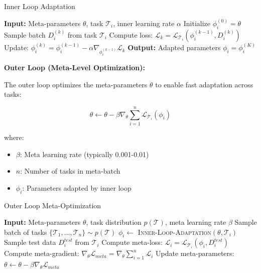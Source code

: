 \documentclass[12pt]{article}
\newcommand{\ieee}[1]{\textcolor{IEEEBlue}{\textbf{#1}}}
\begin{document}
{{			\begin{algorithm}[H]
			\caption{Inner Loop Adaptation}
			\begin{algorithmic}[1]
			\STATE \textbf{Input:} Meta-parameters $\theta$, task $\mathcal{T}_i$, inner learning rate $\alpha$
			\STATE Initialize $\phi_i^{(0)} = \theta$
			\STATE Sample batch $D_i^{(k)}$ from task $\mathcal{T}_i$
			\STATE Compute loss: $\mathcal{L}_k = \mathcal{L}_{\mathcal{T}_i}(\phi_i^{(k-1)}, D_i^{(k)})$
			\STATE Update: $\phi_i^{(k)} = \phi_i^{(k-1)} - \alpha \nabla_{\phi_i^{(k-1)}} \mathcal{L}_k$
			\ENDFOR
			\STATE \textbf{Output:} Adapted parameters $\phi_i = \phi_i^{(K)}$
			\end{algorithmic}
			\end{algorithm}
			
			\ieee{Outer Loop (Meta-Level Optimization):}
			
			The outer loop optimizes the meta-parameters $\theta$ to enable fast adaptation across tasks:
			
			\begin{equation}
			\theta \leftarrow \theta - \beta \nabla_\theta \sum_{i=1}^{n} \mathcal{L}_{\mathcal{T}_i}(\phi_i)
			\end{equation}
			
			where:
			\begin{itemize}
				\item $\beta$: Meta learning rate (typically 0.001-0.01)
				\item $n$: Number of tasks in meta-batch
				\item $\phi_i$: Parameters adapted by inner loop
			\end{itemize}
			
			\begin{algorithm}[H]
			\caption{Outer Loop Meta-Optimization}
			\begin{algorithmic}[1]
			\STATE \textbf{Input:} Meta-parameters $\theta$, task distribution $p(\mathcal{T})$, meta learning rate $\beta$
			\STATE Sample batch of tasks $\{\mathcal{T}_1, \ldots, \mathcal{T}_n\} \sim p(\mathcal{T})$
			\STATE $\phi_i \leftarrow$ \textsc{Inner-Loop-Adaptation}$(\theta, \mathcal{T}_i)$
			\STATE Sample test data $D_i^{test}$ from $\mathcal{T}_i$
			\STATE Compute meta-loss: $\mathcal{L}_i = \mathcal{L}_{\mathcal{T}_i}(\phi_i, D_i^{test})$
			\ENDFOR
			\STATE Compute meta-gradient: $\nabla_\theta \mathcal{L}_{meta} = \nabla_\theta \sum_{i=1}^{n} \mathcal{L}_i$
			\STATE Update meta-parameters: $\theta \leftarrow \theta - \beta \nabla_\theta \mathcal{L}_{meta}$
			\end{algorithmic}
			\end{algorithm}
			
}}
\end{document}
